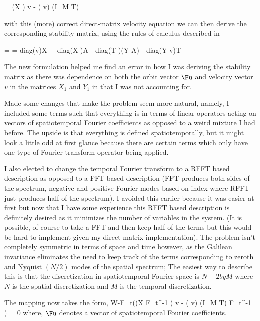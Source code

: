 \beq \label{e-KSsymDMvelnew}
 = (X \cdot \Fu) \ast v - ( \cdot v) \ast (I_M \otimes T) \cdot \Fu
\eeq

with this (more) correct direct-matrix velocity equation we can then derive the corresponding stability matrix,
using the rules of calculus described in 

\beq \label{e-KSsymDMstbnew}
 =  = diag(v)\cdot X + diag(X \cdot \Fu )\cdot A - diag(T \cdot \Fu)\cdot (Y \cdot A) - diag(Y \cdot v)\cdot T
\eeq

The new formulation helped me find an error in how I was deriving the stability matrix as there was dependence on
both the orbit vector $\Fu$ and velocity vector $v$ in the matrices $X_1$ and $Y_1$ in  that
I was not accounting for.


Made some changes that make the problem seem more natural, namely, I included some terms such that everything
is in terms of linear operators acting on vectors of spatiotemporal Fourier coefficients as opposed
to a weird mixture I had before. The upside is that everything is defined spatiotemporally, but it might
look a little odd at first glance because there are certain terms which only have one type of Fourier transform operator being applied.

I also elected to change the temporal Fourier transform to a RFFT based description as opposed to a FFT
based description (FFT produces both sides of the spectrum, negative and positive Fourier modes based on index
where RFFT just produces half of the spectrum). I avoided this earlier because it was easier at first but
now that I have some experience this RFFT based description is definitely desired as it minimizes the number
of variables in the system. (It is possible, of course to take a FFT and then keep half of the terms but
this would be hard to implement given my direct-matrix implementation). The problem isn't completely
symmetric in terms of space and time however, as the Galilean invariance eliminates the need to keep
track of the terms corresponding to zeroth and Nyquist $(N/2)$ modes of the spatial spectrum; The easiest
way to describe this is that the discretization in spatiotemporal Fourier space is $N-2 by M$ where $N$
is the spatial discretization and $M$ is the temporal discretization.


The mapping now takes the form,
\beq \label{e-symredmapping}
W\cdot \Fu -F_t\cdot((X \cdot F_t^{-1} \Fu) \ast v - ( \cdot v) \ast (I_M \otimes T) \cdot F_t^{-1} \cdot \Fu) = 0
\eeq
where, $\Fu$ denotes a vector of spatiotemporal Fourier coefficients.

